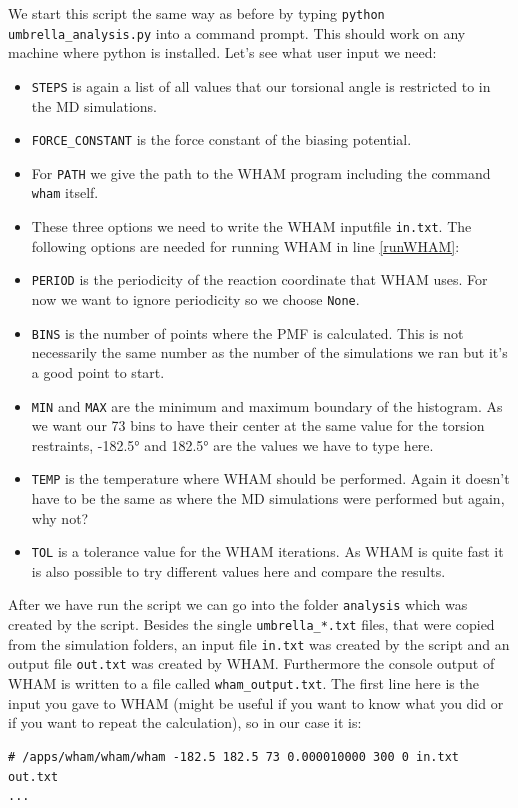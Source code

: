 \documentclass[a4paper,11pt]{scrartcl}
\begin{document}
We start this script the same way as before by typing \texttt{python umbrella\_analysis.py} into a command prompt. This should work on any machine where python is installed. Let's see what user input we need:
\begin{itemize}
	\item \texttt{STEPS} is again a list of all values that our torsional angle is restricted to in the MD simulations. 
	\item \texttt{FORCE\_CONSTANT} is the force constant of the biasing potential. 
	\item For \texttt{PATH} we give the path to the WHAM program including the command \texttt{wham} itself. 
	\item These three options we need to write the WHAM inputfile \texttt{in.txt}. The following options are needed for running WHAM in line \ref{runWHAM}:
	\item \texttt{PERIOD} is the periodicity of the reaction coordinate that WHAM uses. For now we want to ignore periodicity so we choose \texttt{None}.
	\item \texttt{BINS} is the number of points where the PMF is calculated. This is not necessarily the same number as the number of the simulations we ran but it's a good point to start.
	\item \texttt{MIN} and \texttt{MAX} are the minimum and maximum boundary of the histogram. As we want our 73 bins to have their center at the same value for the torsion restraints, -182.5° and 182.5° are the values we have to type here.
	\item \texttt{TEMP} is the temperature where WHAM should be performed. Again it doesn't have to be the same as where the MD simulations were performed but again, why not?
	\item \texttt{TOL} is a tolerance value for the WHAM iterations. As WHAM is quite fast it is also possible to try different values here and compare the results.
\end{itemize}

After we have run the script we can go into the folder \texttt{analysis} which was created by the script. Besides the single \texttt{umbrella\_*.txt} files, that were copied from the simulation folders, an input file \texttt{in.txt} was created by the script and an output file \texttt{out.txt} was created by WHAM. Furthermore the console output of WHAM is written to a file called \texttt{wham\_output.txt}. The first line here is the input you gave to WHAM (might be useful if you want to know what you did or if you want to repeat the calculation), so in our case it is:
\begin{lstlisting}[frame=single]
# /apps/wham/wham/wham -182.5 182.5 73 0.000010000 300 0 in.txt out.txt
...
\end{lstlisting}
\end{document}
